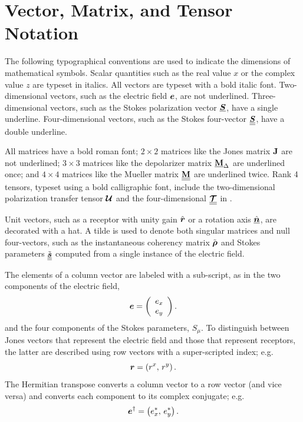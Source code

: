 \section{Vector, Matrix, and Tensor Notation}
\label{app:index}

The following typographical conventions are used to indicate the dimensions of mathematical symbols.  Scalar quantities such as the real value $x$ or the complex value $z$ are typeset in italics.
%
All vectors are typeset with a bold italic font.
%
Two-dimensional vectors, such as the electric field $\mbox{\boldmath $e$}$, are not underlined.
%
Three-dimensional vectors, such as the Stokes polarization vector $\underline{\mbox{\boldmath $S$}}$, have
a single underline.
%
Four-dimensional vectors, such as the Stokes four-vector $\underline{\underline{\mbox{\boldmath $S$}}}$,
have a double underline.

All matrices have a bold roman font; 
%
$2\times2$ matrices like the Jones matrix ${\bf J}$ are not underlined;
%
$3\times3$ matrices like the depolarizer matrix $\underline{{\bf M}}_\Delta$ are underlined once; and
%
$4\times4$ matrices like the Mueller matrix $\underline{\underline{{\bf M}}}$ are underlined twice.
%
Rank 4 tensors, typeset using a bold calligraphic font, 
%
include the two-dimensional polarization transfer tensor $\mbox{\boldmath $\mathcal{U}$}$ and the
four-dimensional $\underline{\underline{{\bf \mbox{\boldmath $\mathcal{T}$}}}}$ in .

Unit vectors, such as a receptor with unity gain
$\hat{\mbox{\boldmath $r$}}$ or a rotation axis $\hat{\underline{\mbox{\boldmath $n$}}}$, are decorated with a hat.
%
A tilde is used to denote both singular matrices and null four-vectors, such as the instantaneous coherency matrix $\tilde{\mbox{\boldmath $\rho$}}$ and  Stokes parameters $\tilde{\underline{\underline{\mbox{\boldmath $s$}}}}$ computed from a single instance of the electric field.

The elements of a column vector are labeled with a sub-script, as in
the two components of the electric field, 
%
\begin{equation}
	\mbox{\boldmath $e$} =
	\left( 
	\begin{array}{c}
		e_x \\
		e_y
	\end{array}
	\right).
\end{equation}
%
and the four components of the Stokes parameters, $S_\mu$.
%
To distinguish between Jones vectors that represent the electric field and those that represent receptors, the latter are described using row vectors with a super-scripted index; e.g.
%
\begin{equation}
	\mbox{\boldmath $r$} = \left( r^x, \, r^y \right).
\end{equation}
%
The Hermitian transpose converts a column vector to a row vector (and vice versa) and converts each component to its complex conjugate; e.g.
\begin{equation}
	\mbox{\boldmath $e$}^\dagger = \left( e_x^*, \, e_y^* \right).
	\label{eqn:Hermitian_transpose}
\end{equation}

